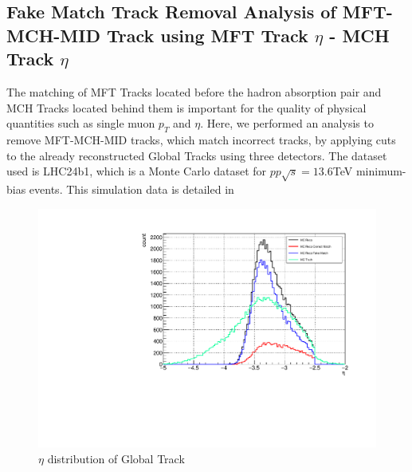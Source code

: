             \subsection{Fake Match Track Removal Analysis of MFT-MCH-MID Track using MFT Track $\eta$ - MCH Track $\eta$}\label{Analysis:Matching}
                The matching of MFT Tracks located before the hadron absorption pair and MCH Tracks located behind them is important for the quality of physical quantities such as single muon $p_T$ and $\eta$. Here, we performed an analysis to remove MFT-MCH-MID tracks, which match incorrect tracks, by applying cuts to the already reconstructed Global Tracks using three detectors. The dataset used is LHC24b1, which is a Monte Carlo dataset for $pp\sqrt{s}=13.6$TeV minimum-bias events. This simulation data is detailed in %

                \begin{figure}[H]
                    \centering
                    \includegraphics[keepaspectratio, scale=0.5]{fig/3_5_6_etacutno_eta.pdf}
                    \caption{$\eta$ distribution of Global Track}
                    \label{Analysis:Matching:eta}
                \end{figure}
                
